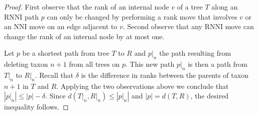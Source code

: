 \documentclass{amsart}
\newcommand{\nni}{\mathrm{NNI}}
\newcommand{\rnni}{\mathrm{RNNI}}
\begin{document}
\begin{proof}
First observe that the rank of an internal node $v$ of a tree $T$ along an $\rnni$ path $p$ can only be changed by performing a rank move that involves $v$ or an $\nni$ move on an edge adjacent to $v$.
Second observe that any $\rnni$ move can change the rank of an internal node by at most one.

Let $p$ be a shortest path from tree $T$ to $R$ and $p{\big|}_n$ the path resulting from deleting taxon $n+1$ from all trees on $p$.
This new path $p{\big|}_n$ is then a path from $T{\big|}_n$ to $R{\big|}_n$.
Recall that $\delta$ is the difference in ranks between the parents of taxon $n+1$ in $T$ and $R$.
Applying the two observations above we conclude that $|p{\big|}_n| \leq |p| - \delta$.
Since $d(T{\big|}_n,R{\big|}_n) \leq |p{\big|}_n|$ and $|p| = d(T,R)$, the desired inequality follows.
\end{proof}
\end{document}
